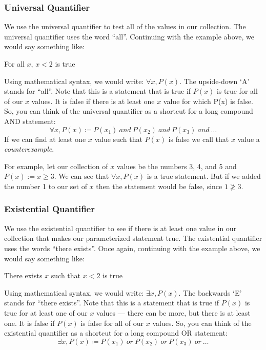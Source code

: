 \documentclass[letterpaper,12pt,fleqn]{article}
\begin{document}
\subsubsection*{Universal Quantifier}

We use the universal quantifier to test all of the values in our collection.
The universal quantifier uses the word ``all''. Continuing with the example
above, we would say something like:

\hspace{0.5in}For all $x$, $x<2$ is true

Using mathematical syntax, we would write: $\forall x, P(x)$. The upside-down
`A' stands for ``all''. Note that this is a statement that is true if $P(x)$ is
true for all of our $x$ values. It is false if there is at least one $x$ value
for which P(x) is false. So, you can think of the universal quantifier as a
shortcut for a long compound AND statement:
\[\forall x,P(x)\coloneqq P(x_1)\ and\ P(x_2)\ and\ P(x_3)\ and\ \ldots\]
If we can find at least one $x$ value such that $P(x)$ is false we call that
$x$ value a \emph{counterexample}.

For example, let our collection of $x$ values be the numbers 3, 4, and 5 and
$P(x):=x\ge3$. We can see that $\forall x,P(x)$ is a true statement. But if we
added the number 1 to our set of $x$ then the statement would be false, since
$1\not\ge3$.

\subsubsection*{Existential Quantifier}

We use the existential quantifier to see if there is at least one value in our
collection that makes our parameterized statement true. The existential
quantifier uses the words ``there exists''. Once again, continuing with the
example above, we would say something like:

\hspace{0.5in}There exists $x$ such that $x<2$ is true

Using mathematical syntax, we would write: $\exists x,P(x)$. The backwards `E'
stands for ``there exists''. Note that this is a statement that is true if
$P(x)$ is true for at least one of our $x$ values --- there can be more, but
there is at least one. It is false if $P(x)$ is false for all of our $x$
values. So, you can think of the existential quantifier as a shortcut for a
long compound OR statement:
\[\exists x,P(x)\coloneqq P(x_1)\ or\ P(x_2)\ or\ P(x_3)\ or\ \ldots\]
\end{document}
